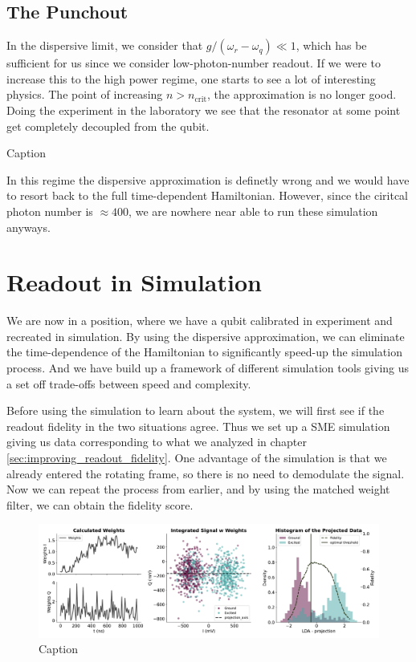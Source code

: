 \subsection{The Punchout}
In the dispersive limit, we consider that $g/(\omega_r - \omega_q) \ll 1$, which has be sufficient for us since we consider low-photon-number readout. If we were to increase this to the high power regime, one starts to see a lot of interesting physics. The point of increasing $n > n_{\text{crit}}$, the approximation is no longer good. Doing the experiment in the laboratory we see that the resonator at some point get completely decoupled from the qubit.

\begin{marginfigure}
    \centering
    \caption{Caption}
    \label{fig:experiment_punchout}
\end{marginfigure}

In this regime the dispersive approximation is definetly wrong and we would have to resort back to the full time-dependent Hamiltonian. However, since the ciritcal photon number is $\approx 400$, we are nowhere near able to run these simulation anyways. 

\section{Readout in Simulation}
We are now in a position, where we have a qubit calibrated in experiment and recreated in simulation. By using the dispersive approximation, we can eliminate the time-dependence of the Hamiltonian to significantly speed-up the simulation process. And we have build up a framework of different simulation tools giving us a set off trade-offs between speed and complexity. 

Before using the simulation to learn about the system, we will first see if the readout fidelity in the two situations agree. Thus we set up a SME simulation giving us data corresponding to what we analyzed in chapter \ref{sec:improving_readout_fidelity}. One advantage of the simulation is that we already entered the rotating frame, so there is no need to demodulate the signal. Now we can repeat the process from earlier, and by using the matched weight filter, we can obtain the fidelity score.

\begin{figure}
    \centering
    \includegraphics[]{Simulations/readout_simulations/figures/weigted_simulation.pdf}
    \caption{Caption}
    \label{fig:enter-label}
\end{figure}

